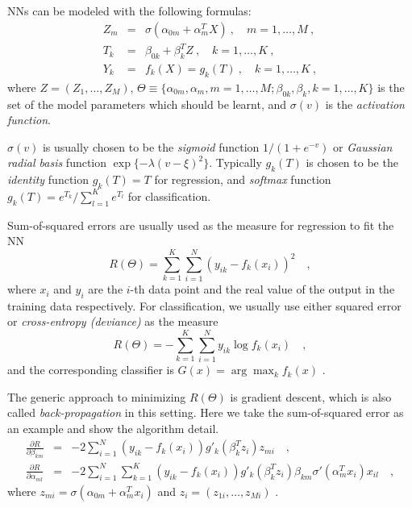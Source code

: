 \documentclass{article}
\begin{document}
NNs can be modeled with the following formulas:
\begin{eqnarray}
Z_m &=& \sigma(\alpha_{0m}+\alpha_m^T X)\ , \quad  m =1, \ldots, M \ ,\\
T_k &=& \beta_{0k} + \beta_k^T Z\ , \quad  k = 1, \ldots, K \ ,\\
Y_k &=& f_k(X) = g_k(T) \ , \quad  k =1, \ldots, K\ ,
\end{eqnarray}
where $Z=(Z_1,\ldots,Z_M)$,
$\Theta \equiv \{\alpha_{0m},\alpha_m, m =1, \ldots, M;\beta_{0k}, \beta_k,k =1, \ldots, K\}$
is the set of the model parameters which should be learnt, and $\sigma(v)$ is the \textit{activation function}.

$\sigma(v)$ is usually chosen to be the \textit{sigmoid} function $1/(1+e^{-v})$ or
\textit{Gaussian radial basis} function $\exp\{-\lambda( v-\xi )^2\}$.
Typically $g_k(T)$ is chosen to be the \textit{identity} function $g_k(T)=T$ for regression,
and \textit{softmax} function $g_k(T)=e^{T_k}/ \sum_{l=1}^K e^{T_l}$ for classification.

Sum-of-squared errors are usually used as the measure for regression to fit the NN
\begin{equation}
R(\Theta) = \sum^K_{k=1}\sum^N_{i=1} ( y_{ik}- f_k(x_i))^2 \quad ,
\end{equation}
where $x_i$ and $y_i$ are the $i$-th data point and the real value of the output
in the training data respectively.
For classification, we usually use either squared error or \textit{cross-entropy (deviance)}
as the measure
\begin{equation}
R(\Theta) = -\sum^K_{k=1}\sum^N_{i=1} y_{ik}\log f_k(x_i) \quad ,
\end{equation}
and the corresponding classifier is $G(x)= \arg \max_k f_k(x)$ .

The generic approach to minimizing $R(\Theta)$ is gradient descent, which
is also called \textit{back-propagation} in this setting.
Here we take the sum-of-squared error as an example and show the algorithm detail.
\begin{eqnarray}
\frac{\partial R}{\partial \beta_{km}} &=& -2\sum^N_{i=1}(y_{ik}-f_k(x_i))g'_k(\beta_k^Tz_i)z_{mi} \quad,\\
\frac{\partial R}{\partial \alpha_{ml}} &=& -2\sum^N_{i=1}\sum^K_{k=1}(y_{ik}-f_k(x_i))g'_k(\beta_k^Tz_i)
\beta_{km}\sigma'(\alpha_m^Tx_i)x_{il} \quad,
\end{eqnarray}
where $z_{mi}=\sigma(\alpha_{0m}+\alpha_m^Tx_i)$ and $z_i=(z_{1i},\ldots,z_{Mi})$ .
\end{document}
